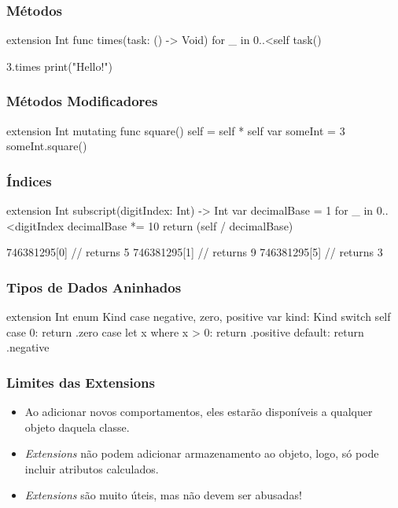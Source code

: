 \begin{frame}[fragile]
    \frametitle{Métodos}
    \begin{swift}
        extension Int {
            func times(task: () -> Void) {
                for _ in 0..<self {
                    task()
                }
            }
        }

        3.times {
            print("Hello!")
        }
    \end{swift}
\end{frame}

\begin{frame}[fragile]
    \frametitle{Métodos Modificadores}
    \begin{swift}
    extension Int {
        mutating func square() {
            self = self * self
        }
    }
    var someInt = 3
    someInt.square()
    \end{swift}
\end{frame}

\begin{frame}[fragile]
    \frametitle{Índices}
    \begin{swift}
    extension Int {
        subscript(digitIndex: Int) -> Int {
            var decimalBase = 1
            for _ in 0..<digitIndex {
                decimalBase *= 10
            }
            return (self / decimalBase) %
        }
    }

    746381295[0] // returns 5
    746381295[1] // returns 9
    746381295[5] // returns 3
    \end{swift}
\end{frame}

\begin{frame}[fragile]
    \frametitle{Tipos de Dados Aninhados}
    \begin{swift}
    extension Int {
        enum Kind {
            case negative, zero, positive
        }
        var kind: Kind {
            switch self {
            case 0:
                return .zero
            case let x where x > 0:
                return .positive
            default:
                return .negative
            }
        }
    }
    \end{swift}
\end{frame}

\begin{frame}[fragile]
    \frametitle{Limites das Extensions}
    \begin{itemize}
        \setlength\itemsep{0.5cm}
        \item Ao adicionar novos comportamentos, eles estarão
        disponíveis a qualquer objeto daquela classe.
        \item \textit{Extensions} não podem adicionar armazenamento ao
        objeto, logo, só pode incluir atributos calculados.
        \item \textit{Extensions} são muito úteis, mas não devem ser
        abusadas!
    \end{itemize}
\end{frame}


